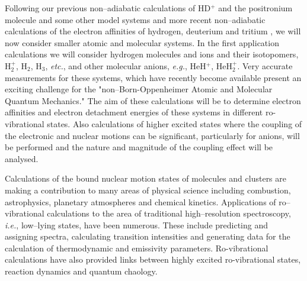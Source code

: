 Following our previous non--adiabatic calculations of HD$^+$
and the positronium molecule and some other model systems
\cite{A3,A6,A16,A27,kozlowski91,%
kozlowski92b,kozlowski92c} and more 
recent non--adiabatic calculations
of the electron affinities of hydrogen, deuterium and tritium
\cite{A37},
we will now consider smaller atomic and molecular systems.
In the first application calculations 
we will consider
hydrogen molecules and ions and their isotopomers,
H$_2^+$, H$_2$, H$_3$, {\it etc.}, 
and other molecular anions, {\it e.g.}, HeH$^+$, HeH$_2^+$.
Very accurate measurements for these systems, which have recently become
available present an exciting challenge for 
the "non--Born-Oppenheimer Atomic and Molecular Quantum Mechanics."
The aim of these calculations will be to determine 
electron affinities and electron detachment energies 
of these systems in different ro-vibrational states.
Also calculations of 
higher excited states
where the coupling of the electronic and nuclear motions
can be significant, particularly for anions,
will be performed and the nature and magnitude of the 
coupling effect will be 
analysed.

Calculations of the bound nuclear motion states of molecules and
clusters are making a contribution to many areas of physical science
including combustion, astrophysics, planetary atmospheres and
chemical kinetics. Applications of ro--vibrational calculations
to the area of traditional high--resolution spectroscopy, {\it i.e.},
low--lying states, have been numerous. These include predicting and
assigning spectra, calculating transition intensities and 
generating data for the calculation of thermodynamic and emissivity
parameters. Ro-vibrational calculations have also provided links
between highly excited ro-vibrational states, reaction dynamics and
quantum chaology.

